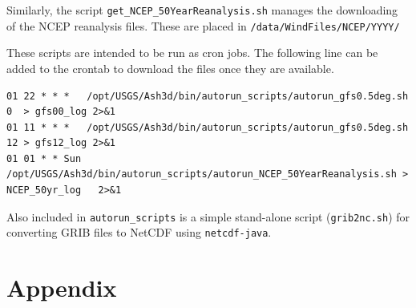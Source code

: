 \documentclass[11pt]{article}   %
\begin{document}
Similarly, the script \texttt{get\_NCEP\_50YearReanalysis.sh} manages the downloading of 
the NCEP reanalysis files.  These are placed in \texttt{/data/WindFiles/NCEP/YYYY/}

These scripts are intended to be run as cron jobs.  The following line can be added to the
crontab to download the files once they are available.
\footnotesize
\begin{verbatim}
01 22 * * *   /opt/USGS/Ash3d/bin/autorun_scripts/autorun_gfs0.5deg.sh 0  > gfs00_log 2>&1
01 11 * * *   /opt/USGS/Ash3d/bin/autorun_scripts/autorun_gfs0.5deg.sh 12 > gfs12_log 2>&1
01 01 * * Sun /opt/USGS/Ash3d/bin/autorun_scripts/autorun_NCEP_50YearReanalysis.sh > NCEP_50yr_log   2>&1
\end{verbatim}
\normalsize

Also included in \texttt{autorun\_scripts} is a simple stand-alone script (\texttt{grib2nc.sh})
for converting GRIB files to NetCDF using \texttt{netcdf-java}.

\clearpage

\section{Appendix}
\end{document}

